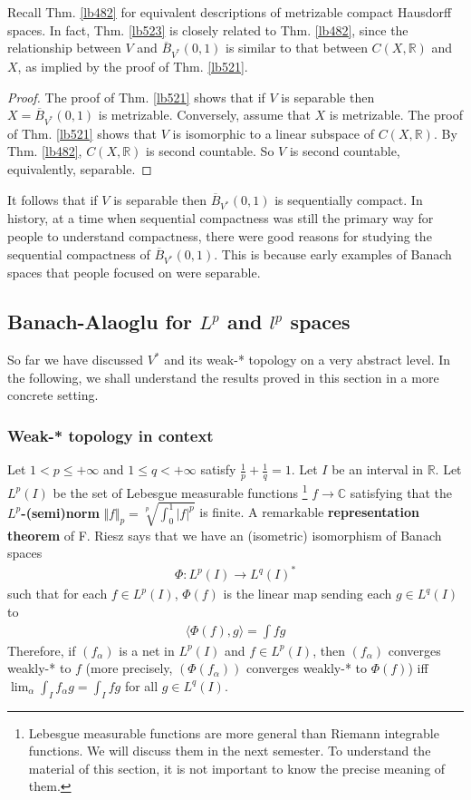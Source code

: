 \documentclass[12pt,b5paper,notitlepage]{article}
\theoremstyle{definition}
\theoremstyle{plain}
\newcommand{\ovl}{\overline}
\newcommand{\bk}[1]{\langle {#1}\rangle}
\newcommand{\Cbb}{\mathbb C}
\newcommand{\Rbb}{\mathbb R}
\numberwithin{equation}{section}
\begin{document}
Recall Thm. \ref{lb482} for equivalent descriptions of metrizable compact Hausdorff spaces. In fact, Thm. \ref{lb523} is closely related to Thm. \ref{lb482}, since the relationship between $V$ and $\ovl B_{V^*}(0,1)$ is similar to that between $C(X,\Rbb)$ and $X$, as implied by the proof of Thm. \ref{lb521}. 

\begin{proof}
The proof of Thm. \ref{lb521} shows that if $V$ is separable then $X=\ovl B_{V^*}(0,1)$ is metrizable. Conversely, assume that $X$ is metrizable. The proof of Thm. \ref{lb521} shows that $V$ is isomorphic to a linear subspace of $C(X,\Rbb)$. By Thm. \ref{lb482}, $C(X,\Rbb)$ is second countable. So $V$ is second countable, equivalently, separable.
\end{proof}


It follows that if $V$ is separable then $\ovl B_{V^*}(0,1)$ is sequentially compact. In history, at a time when sequential compactness was still the primary way for people to understand compactness, there were good reasons for studying the sequential compactness of $\ovl B_{V^*}(0,1)$. This is because early examples of Banach spaces that people focused on were separable.




\subsection{Banach-Alaoglu for $L^p$ and $l^p$ spaces}


So far we have discussed $V^*$ and its weak-* topology on a very abstract level. In the following, we shall understand the results proved in this section in a more concrete setting.

\subsubsection{Weak-* topology in context}

Let $1<p\leq +\infty$ and $1\leq q<+\infty$ satisfy $\frac 1p+\frac 1q=1$. Let $I$ be an interval in $\Rbb$. Let $L^p(I)$ be the set of Lebesgue measurable functions \footnote{Lebesgue measurable functions are more general than Riemann integrable functions. We will discuss them in the next semester. To understand the material of this section, it is not important to know the precise meaning of them.} $f\rightarrow\Cbb$ satisfying that the \textbf{$L^p$-(semi)norm} $\Vert f\Vert_p=\sqrt[p]{\int_0^1 |f|^p}$ is finite. A remarkable \textbf{representation theorem} of F. Riesz says that we have an (isometric) isomorphism of Banach spaces
\begin{align*}
\Phi:L^p(I)\rightarrow L^q(I)^*
\end{align*}
such that for each $f\in L^p(I)$, $\Phi(f)$ is the linear map sending each $g\in L^q(I)$ to
\begin{align*}
\bk{\Phi(f),g}=\int fg
\end{align*}
Therefore, if $(f_\alpha)$ is a net in $L^p(I)$ and $f\in L^p(I)$, then $(f_\alpha)$ converges weakly-* to $f$ (more precisely, $(\Phi(f_\alpha))$ converges weakly-* to $\Phi(f)$) iff $\lim_\alpha\int_I f_\alpha g=\int_I fg$ for all $g\in L^q(I)$.
\end{document}
